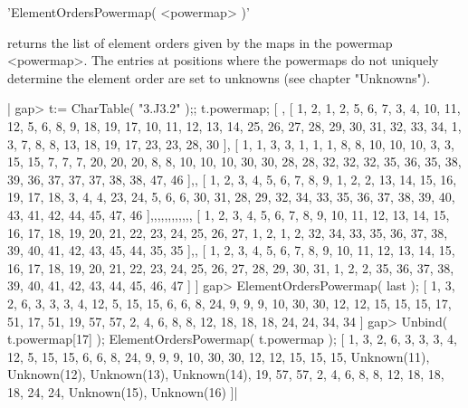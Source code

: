 
'ElementOrdersPowermap( <powermap> )'

returns the list of element orders given by the maps in the powermap
<powermap>.  The entries at positions where the powermaps do not uniquely
determine the element order are set to unknowns (see chapter "Unknowns").

|    gap> t:= CharTable( "3.J3.2" );; t.powermap;
    [ , [ 1, 2, 1, 2, 5, 6, 7, 3, 4, 10, 11, 12, 5, 6, 8, 9, 18, 19, 17,
          10, 11, 12, 13, 14, 25, 26, 27, 28, 29, 30, 31, 32, 33, 34, 1,
          3, 7, 8, 8, 13, 18, 19, 17, 23, 23, 28, 30 ], 
      [ 1, 1, 3, 3, 1, 1, 1, 8, 8, 10, 10, 10, 3, 3, 15, 15, 7, 7, 7, 20,
          20, 20, 8, 8, 10, 10, 10, 30, 30, 28, 28, 32, 32, 32, 35, 36,
          35, 38, 39, 36, 37, 37, 37, 38, 38, 47, 46 ],, 
      [ 1, 2, 3, 4, 5, 6, 7, 8, 9, 1, 2, 2, 13, 14, 15, 16, 19, 17, 18, 
          3, 4, 4, 23, 24, 5, 6, 6, 30, 31, 28, 29, 32, 34, 33, 35, 36, 
          37, 38, 39, 40, 43, 41, 42, 44, 45, 47, 46 ],,,,,,,,,,,, 
      [ 1, 2, 3, 4, 5, 6, 7, 8, 9, 10, 11, 12, 13, 14, 15, 16, 17, 18, 
          19, 20, 21, 22, 23, 24, 25, 26, 27, 1, 2, 1, 2, 32, 34, 33, 35, 
          36, 37, 38, 39, 40, 41, 42, 43, 45, 44, 35, 35 ],, 
      [ 1, 2, 3, 4, 5, 6, 7, 8, 9, 10, 11, 12, 13, 14, 15, 16, 17, 18, 
          19, 20, 21, 22, 23, 24, 25, 26, 27, 28, 29, 30, 31, 1, 2, 2, 
          35, 36, 37, 38, 39, 40, 41, 42, 43, 44, 45, 46, 47 ] ]
    gap> ElementOrdersPowermap( last );
    [ 1, 3, 2, 6, 3, 3, 3, 4, 12, 5, 15, 15, 6, 6, 8, 24, 9, 9, 9, 10, 
      30, 30, 12, 12, 15, 15, 15, 17, 51, 17, 51, 19, 57, 57, 2, 4, 6, 8, 
      8, 12, 18, 18, 18, 24, 24, 34, 34 ]
    gap> Unbind( t.powermap[17] ); ElementOrdersPowermap( t.powermap );
    [ 1, 3, 2, 6, 3, 3, 3, 4, 12, 5, 15, 15, 6, 6, 8, 24, 9, 9, 9, 10, 
      30, 30, 12, 12, 15, 15, 15, Unknown(11), Unknown(12), Unknown(13),
      Unknown(14), 19, 57, 57, 2, 4, 6, 8, 8, 12, 18, 18, 18, 24, 24,
      Unknown(15), Unknown(16) ]|

